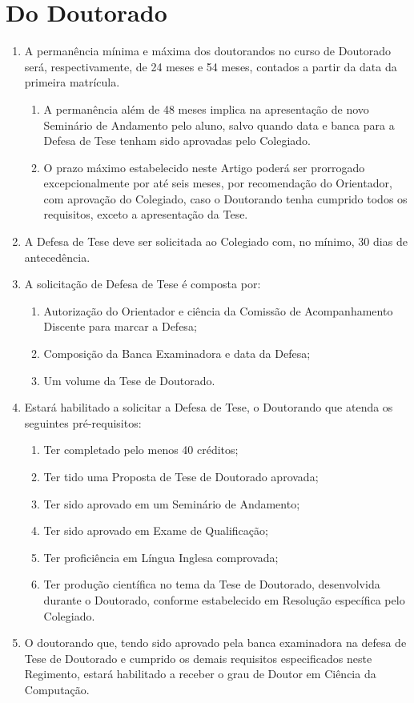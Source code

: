 \documentclass{article}
\newcommand{\grupoMenor}{Colegiado\xspace}
\begin{document}
\section{Do Doutorado}
\begin{enumerate}
	\item  A permanência mínima e máxima dos doutorandos no curso de Doutorado será, respectivamente, de 24 meses e 54 meses, contados a partir da data da primeira matrícula.
	\begin{enumerate}
		\item A permanência além de 48 meses implica na apresentação de novo Seminário de Andamento pelo aluno, salvo quando data e banca para a Defesa de Tese tenham sido aprovadas pelo \grupoMenor.	
		\item O prazo máximo estabelecido neste Artigo poderá ser prorrogado excepcionalmente por até seis meses, por recomendação do Orientador, com aprovação do \grupoMenor, caso o Doutorando tenha cumprido todos os requisitos, exceto a apresentação da Tese.
	\end{enumerate}
	
	\item A Defesa de Tese deve ser solicitada ao \grupoMenor com, no mínimo, 30 dias de antecedência. 
	\item A solicitação de Defesa de Tese é composta por:
	\begin{enumerate}[label=\Roman*]
        \item Autorização do Orientador e ciência da Comissão de Acompanhamento Discente para marcar a Defesa;
        \item Composição da Banca Examinadora e data da Defesa;
        \item Um volume da Tese de Doutorado.
    \end{enumerate}
	\item Estará habilitado a solicitar a Defesa de Tese, o Doutorando que atenda os seguintes pré-requisitos:
	\begin{enumerate}[label=\Roman*]
		\item	Ter completado pelo menos 40 créditos;
		\item	Ter tido uma Proposta de Tese de Doutorado aprovada;
		\item	Ter sido aprovado em um Seminário de Andamento;
		\item	Ter sido aprovado em Exame de Qualificação;
		\item 	Ter proficiência em Língua Inglesa comprovada;
		\item	Ter produção científica no tema da Tese de Doutorado, desenvolvida durante o Doutorado, conforme estabelecido em Resolução específica pelo \grupoMenor.
	\end{enumerate}

	\item  O doutorando que, tendo sido aprovado pela banca examinadora na defesa de Tese de Doutorado e cumprido os demais requisitos especificados neste Regimento, estará habilitado a receber o grau de Doutor em Ciência da Computação.
\end{enumerate}
\end{document}
